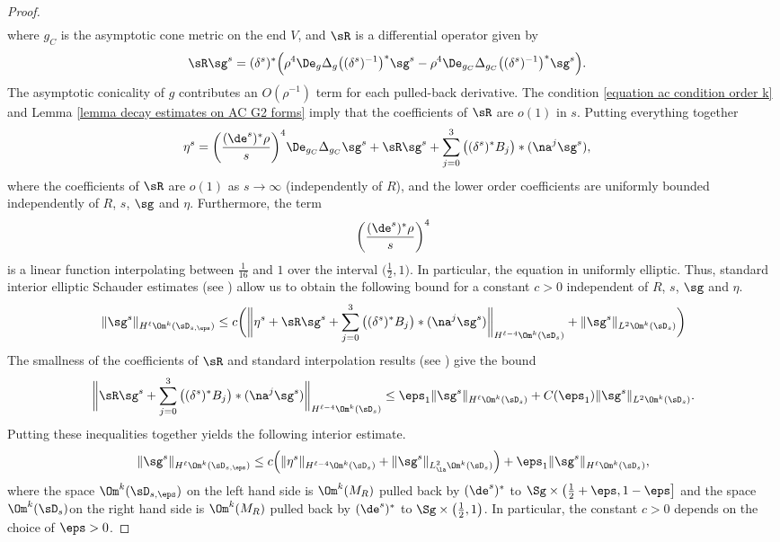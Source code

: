 \documentclass[hidelinks, 12pt, oneside, reqno]{amsart}
\begin{document}
\begin{proof}
\begin{align*}
    \end{align*}
    where $g_{C}$ is the asymptotic cone metric on the end $V$, and $\sR$ is a differential operator given by
    \begin{align*}
    \sR \sg^s &= (\delta^s)^* \Big(\rho^{4}\De_{g}\Delta_{g}\big((\delta^s)^{-1}\big)^*\sg^s - \rho^{4}\De_{g_{C}}\Delta_{g_{C}}\big((\delta^s)^{-1}\big)^*\sg^s \Big).
    \end{align*}
    The asymptotic conicality of $g$ contributes an $O(\rho^{-1})$ term for each pulled-back derivative.  The condition \eqref{equation ac condition order k} and Lemma \ref{lemma decay estimates on AC G2 forms} imply that the coefficients of $\sR$ are $o(1)$ in $s$. Putting everything together
    \begin{align}\label{equation rescaled elliptic system}
    \eta^s
    &= \bigg(\frac{(\de^s)^* \rho}{s}\bigg)^4 \De_{g_C} \Delta_{g_C} \sg^s + \sR \sg^s + \sum_{j=0}^3 \big((\delta^s)^*B_j\big) * (\na^j \sg^s),
    \end{align}
    where the coefficients of $\sR$ are $o(1)$ as $s\rightarrow \infty$ (independently of $R$), and the lower order coefficients are uniformly bounded independently of $R$, $s$, $\sg$ and $\eta$. Furthermore, the term 
    \[
    \bigg(\frac{(\de^s)^* \rho}{s}\bigg)^4
    \]
    is a linear function interpolating between $\tfrac{1}{16}$ and $1$ over the interval $\big(\tfrac12, 1 \big)$. In particular, the equation in uniformly elliptic. Thus, standard interior elliptic Schauder estimates (see \cite[Corollary 10.3.9]{NicolaescuManifoldLectures}) allow us to obtain the following bound for a constant $c > 0$ independent of $R$, $s$, $\sg$ and $\eta$.
    \begin{equation}
      \|\sg^s\|_{H^{\ell}\Om^k(\sD_{s,\eps})} \le c\bigg(\bigg\|\eta^s + \sR \sg^s + \sum_{j=0}^3 \big((\delta^s)^*B_j\big) * (\na^j \sg^s)\bigg\|_{H^{\ell-4}\Om^k(\sD_s)} + \|\sg^s\|_{L^2 \Om^k(\sD_s)} \bigg)
    \end{equation}
    The smallness of the coefficients of $\sR$ and standard interpolation results (see \cite[Theorem 7.28]{GT}) give the bound 
    \[
    \bigg\| \sR \sg^s  + \sum_{j=0}^3 \big((\delta^s)^*B_j\big) * (\na^j \sg^s)\bigg\|_{H^{\ell-4}\Om^k(\sD_s)}  \le \eps_1 \|\sg^s\|_{H^{\ell}\Om^k(\sD_{s})} + C(\eps_1) \|\sg^s\|_{L^2 \Om^k(\sD_s)}.
    \]
    Putting these inequalities together yields the following interior estimate.
    \begin{equation}\label{equation interior elliptic schauder estimates}
      \|\sg^s\|_{H^{\ell}\Om^k(\sD_{s,\eps})} \le c\Big(\|\eta^s\|_{H^{\ell-4}\Om^k(\sD_s)} + \|\sg^s\|_{L^2_{\la}\Om^k(\sD_s)} \Big) + \eps_1 \|\sg^s\|_{H^{\ell} \Om^k(\sD_{s})},
    \end{equation}
    where the space $\Om^k(\sD_{s,\eps})$ on the left hand side is $\Om^k(M_R)$ pulled back by $(\de^s)^*$ to $\Sg \times \big(\tfrac12 + \eps, 1 - \eps\big]$ and the space $\Om^k(\sD_{s})$on the right hand side is $\Om^k(M_R)$ pulled back by $(\de^s)^*$ to $\Sg \times \big(\tfrac12, 1\big)$. In particular, the constant $c >0$ depends on the choice of $\eps > 0$.


\end{proof}
\end{document}
